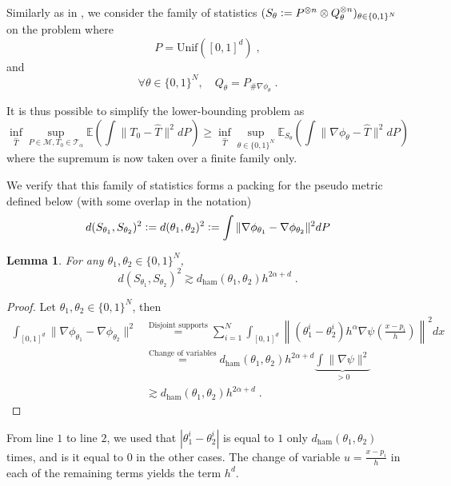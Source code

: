 \documentclass{article}
\theoremstyle{plain}
\newtheorem{lemma}[theorem]{Lemma}
\theoremstyle{definition}
\theoremstyle{remark}
\newcommand{\E}[0]{\mathbb{E}}
\newcommand{\eqdef}{\vcentcolon=}
\newcommand\ham[2]{d_\mathrm{ham}\left( {#1}, {#2} \right)}
\newcommand\p[1]{\left( {#1}\right)}
\begin{document}
Similarly as in \cite{hutter2021minimax}, we consider the family of statistics $(S_{\theta} \eqdef P^{\otimes n} \otimes Q_{\theta}^{\otimes n})_{\theta \in \{0, 1 \}^{N}}$ on the problem where
\begin{equation}
    P = \text{Unif}([0, 1]^d) \;,
\end{equation}
and 
\begin{equation}
    \forall \theta \in \{0, 1 \}^{N}, \quad 
    Q_{\theta} = {P}_{\# \nabla \phi_{\theta}} \;.
\end{equation}

It is thus possible to simplify the lower-bounding problem as
\begin{equation}
\label{eq:familytopacking}
\inf_{\hat{T}} \sup_{P \in \mathcal{M}, T_0 \in \mathcal{T}_{\alpha}}
    \E\p{\int \| T_0 - \hat{T}  \|^2 dP}
        \geq
        \inf_{\hat{T}} \sup_{\theta \in \{0, 1 \}^{N}} \E_{S_{\theta}} \p{\int \| \nabla \phi_{\theta} - \hat{T}  \|^2 dP}
    \end{equation}
where the supremum is now taken over a finite family only.

We verify that this family of statistics forms a packing 
for the pseudo metric defined below (with some overlap in the notation)
\begin{equation}
    d(S_{\theta_1}, S_{\theta_2})^2 \eqdef d(\theta_1, \theta_2)^2
        \eqdef \int \| \nabla \phi_{\theta_1} - \nabla \phi_{\theta_2}  \|^2 dP
\end{equation}

\begin{lemma}
\label{lemma:packingdistance}
    For any $\theta_1, \theta_2 \in \{0, 1 \}^{N}$, 
    \begin{equation}
        d(S_{\theta_1}, S_{\theta_2})^2
        \gtrsim \ham{\theta_1}{\theta_2} h^{2 \alpha + d} \;.
    \end{equation}
\end{lemma}
\begin{proof}
    Let $\theta_1, \theta_2\in \{0, 1 \}^{N}$, then
\begin{equation}
\label{eq:distkernelsaw}
\begin{aligned}
    \int_{[0, 1]^d} \| \nabla \phi_{\theta_1} - \nabla \phi_{\theta_2}  \|^2 
    &\stackrel{\text{Disjoint supports}}{=}
    \sum_{i=1}^{N} \int_{[0, 1]^d}
    \left\|(\theta_1^i-\theta_2^i) h^{\alpha } \nabla \psi\p{\frac{x-p_i }{h}} \right\|^2 dx \\
    &\stackrel{\text{Change of variables}}{=}
    \ham{\theta_1}{\theta_2} h^{2 \alpha + d} \underbrace{\int \|\nabla \psi\|^2}_{> 0} \\
    &\gtrsim \ham{\theta_1}{\theta_2} h^{2 \alpha + d} \;.
\end{aligned}
\end{equation}
\end{proof}
From line $1$ to line $2$, we used that $|\theta_1^i-\theta_2^i|$ is equal to $1$ only $\ham{\theta_1}{\theta_2}$ times, and is it equal to $0$ in the other cases. The change of variable $u = \frac{x-p_i }{h}$ in each of the remaining terms yields the term $h^d$.
\end{document}
